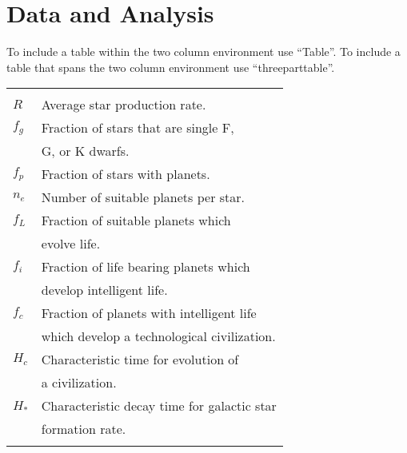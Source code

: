 
\section{Data and Analysis}
To include a table within the two column environment use ``Table''.
To include a table that spans the two column environment use
``threeparttable''.


\begin{Table}
\begin{tabular}{ll}
\hline\hline
      & \\
$R$   & Average star production rate.\\
$f_g$ & Fraction of stars that are single F, \\
      & G, or K dwarfs.\\
$f_p$ & Fraction of stars with planets.\\
$n_e$ & Number of suitable planets per star.\\
$f_L$ & Fraction of suitable planets which \\
      & evolve life.\\
$f_i$ & Fraction of life bearing planets which \\
	  & develop intelligent life.\\
$f_c$ & Fraction of planets with intelligent life \\
	  & which develop a technological civilization.\\
$H_c$ & Characteristic time for evolution of \\
      & a civilization. \\
$H_*$ & Characteristic decay time for galactic star\\
	  & formation rate. \\
      & \\
\hline
\end{tabular}
\label{tab:drake}
\end{Table}


